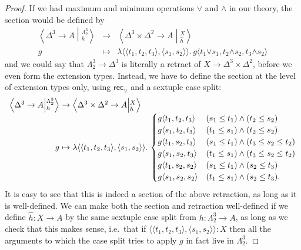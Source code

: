 \documentclass{amsart}
\theoremstyle{plain}
\theoremstyle{definition}
\theoremstyle{remark}
\numberwithin{equation}{section}
\newcommand{\ndexten}[4]{\left\langle #1 \to #2 \middle|^{#3}_{#4}\right\rangle}
\newcommand{\pair}[1]{\langle #1\rangle}
\newcommand{\rec}{\mathsf{rec}}
\newcommand{\lam}[1]{\lambda #1.\,}
\begin{document}
\begin{proof}
  If we had maximum and minimum operations $\pmb{\lor}$ and $\pmb{\land}$ in our theory, the section would be defined by
  \[
  \begin{array}{ccc}
    \ndexten{\Delta^3}{A}{\Lambda^3_2}{h} & \to &\ndexten{\Delta^3\times\Delta^2}{A}{X}{\hat h}\\
    g & \mapsto & \lam{\pair{\pair{t_1,t_2,t_3},\pair{s_1,s_2}}} g\pair{t_1 \mathbin{\pmb{\lor}} s_1, t_2 \mathbin{\pmb{\land}} s_2, t_3 \mathbin{\pmb{\land}} s_2}
  \end{array}
  \]
  and we could say that $\Lambda^3_2 \to \Delta^3$ is literally a retract of $X \to \Delta^3\times \Delta^2$, before we even form the extension types.
  Instead, we have to define the section at the level of extension types only, using $\rec_\lor$ and a sextuple case split:
  \[
  \begin{array}{r@{}l}
    \ndexten{\Delta^3}{A}{\Lambda^3_2}{h}\  &\to  \ndexten{\Delta^3\times\Delta^2}{A}{X}{\hat h}\\
    g\  &\mapsto  \lam{\pair{\pair{t_1,t_2,t_3},\pair{s_1,s_2}}}
    \begin{cases}
      g\pair{t_1,t_2,t_3} & (s_1\le t_1) \land (t_2\le s_2)\\
      g\pair{s_1,t_2,t_3} & (t_1\le s_1) \land (t_2\le s_2)\\
      g\pair{t_1,s_2,t_3} & (s_1\le t_1) \land (t_3\le s_2\le t_2)\\
      g\pair{s_1,s_2,t_3} & (t_1\le s_1) \land (t_3\le s_2\le t_2)\\
      g\pair{t_1,s_2,s_2} & (s_1\le t_1) \land (s_2\le t_3)\\
      g\pair{s_1,s_2,s_2} & (t_1\le s_1) \land (s_2\le t_3).
    \end{cases}
  \end{array}
  \]
  It is easy to see that this is indeed a section of the above retraction, as long as it is well-defined.
  We can make both the section and retraction well-defined if we define $\hat h : X \to A$ by the same sextuple case split from $h:\Lambda^3_2\to A$, as long as we check that this makes sense, i.e.\ that if $\pair{\pair{t_1,t_2,t_3},\pair{s_1,s_2}}:X$ then all the arguments to which the case split tries to apply $g$ in fact live in $\Lambda^3_2$.


\end{proof}
\end{document}
